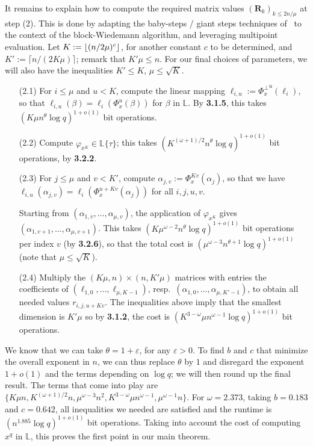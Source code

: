 \documentclass[sigconf]{acmart}
\renewcommand{\L}{\mathbb{L}}
\newcommand{\ang}[1]{\{#1\}}
\DeclarePairedDelimiter\floor{\lfloor}{\rfloor}
\begin{document}
It remains to explain how to compute the required matrix values $({\bm
  R}_k)_{k \le 2n/\mu}$ at step (2). This is done by adapting the
baby-steps / giant steps techniques of~\cite[Algorithm {\bf
    AP}]{KaSh98} to the context of the block-Wiedemann algorithm, and
leveraging multipoint evaluation.  Let $K:=\floor*{ (n/2\mu)^{c}}$,
for another constant $c$ to be determined, and $K':=\lceil n/(2K\mu )
\rceil$; remark that $K' \mu\le n$.  For our final choices of
parameters, we will also have the inequalities $K' \le K$, $\mu \le
\sqrt{K}$.
\begin{enumerate}
\item[(2.1)] For $i \le \mu$ and $u < K$, compute the linear mapping
  $\ell_{i,u}:= {\Phi_x^\perp}^u(\ell_i)$, so that $\ell_{i,u}(\beta)
  = \ell_i( \Phi_x^u(\beta) )$ for $\beta$ in $\L$. By {\bf 3.1.5},
  this takes $ (K \mu n^{\theta} \log q)^{1+o(1)}$ bit
  operations.

\item[(2.2)] Compute $\varphi_{x^K} \in \L\ang{\tau}$; 
  this takes $(K^{(\omega+1)/2}n^\theta \log q)^{1+o(1)}$ bit
  operations, by {\bf 3.2.2}.

\item[(2.3)] For $j \le \mu$ and $v < K'$, compute $\alpha_{j,v} :=
  \Phi_x^{Kv}(\alpha_j)$, so that we have
  $\ell_{i,u}(\alpha_{j,v}) = \ell_i( \Phi_x^{u+Kv}(\alpha_j) )$ for
  all $i,j,u,v$.

Starting from $(\alpha_{1,v},\dots,\alpha_{\mu,v})$, the application
of $\varphi_{x^K}$ gives
$(\alpha_{1,v+1},\dots,\alpha_{\mu,v+1})$. This takes $ (K
\mu^{\omega-2} n^{\theta} \log q)^{1+o(1)}$ bit operations per index
$v$ (by {\bf 3.2.6}), so that the total cost is $(\mu^{\omega-3} n^{\theta+1}
\log q)^{1+o(1)}$ (note that $\mu \le \sqrt{K}$).

\item[(2.4)] Multiply the $(K\mu,n) \times (n,K'\mu)$ matrices with
  entries the coefficients of $(\ell_{1,0},\dots,\ell_{\mu,K-1})$,
  resp.\, $(\alpha_{1,0},\dots,\alpha_{\mu,K'-1})$, to obtain all
  needed values $r_{i,j,u+Kv}$.  The inequalities above imply that the
  smallest dimension is $K'\mu$ so by {\bf 3.1.2}, the cost is $(K^{3-\omega}\mu n^{\omega-1} \log q)^{1 + o(1)}$ bit operations.
\end{enumerate}
We know that we can take $\theta=1+\varepsilon$, for any $\varepsilon
> 0$. To find $b$ and $c$ that minimize the overall exponent in $n$, we can
thus replace $\theta$ by $1$ and disregard the exponent $1+o(1)$ and
the terms depending on $\log q$; we will then round up the final
result.  The terms that come into play are $\{K\mu n,
K^{(\omega+1)/2}n, \mu^{\omega-3} n^2,  K^{3-\omega}\mu n^{\omega-1},
\mu^{\omega-1} n\}$.  For $\omega = 2.373$, taking $b = 0.183$ and
$c=0.642$, all inequalities we needed are satisfied and the runtime is
$(n^{1.885} \log q)^{1 + o(1)}$ bit operations. Taking into account
the cost of computing $x^q$ in $\L$, this proves the first point in
our main theorem.
\end{document}
